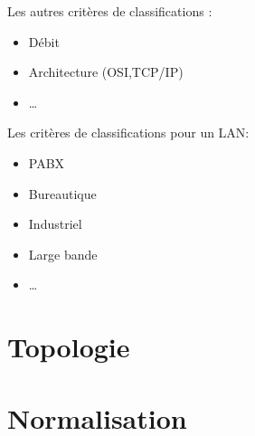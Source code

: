 \documentclass[12pt,a4paper,openany]{book}
\begin{document}
		Les autres critères de classifications : 
		\begin{itemize}
			\item Débit
			\item Architecture (OSI,TCP/IP)
			\item \ldots
		\end{itemize}

		Les critères de classifications pour un LAN: 
		\begin{itemize}
			\item PABX
			\item Bureautique
			\item Industriel
			\item Large bande
			\item \ldots
		\end{itemize}
	\chapter{Topologie}
	\chapter{Normalisation}
\end{document}
